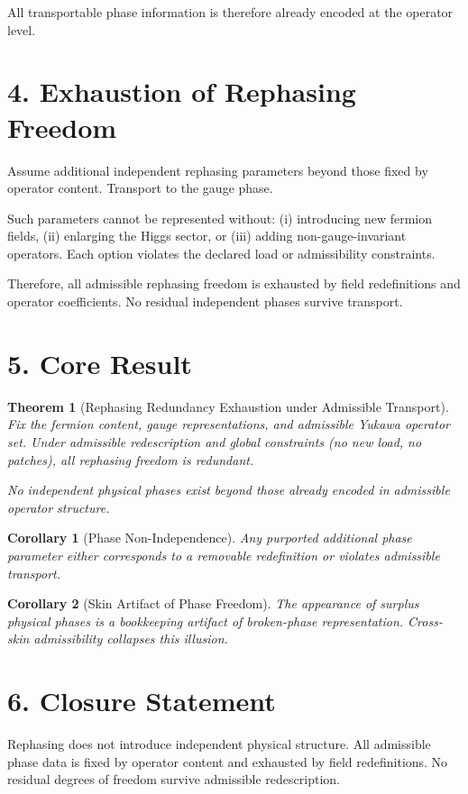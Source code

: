 ﻿\documentclass[11pt]{article}
\newtheorem{theorem}{Theorem}
\newtheorem{corollary}{Corollary}
\begin{document}
All transportable phase information is therefore already encoded
at the operator level.

\section*{4. Exhaustion of Rephasing Freedom}
Assume additional independent rephasing parameters
beyond those fixed by operator content.
Transport to the gauge phase.

Such parameters cannot be represented without:
(i) introducing new fermion fields,
(ii) enlarging the Higgs sector, or
(iii) adding non-gauge-invariant operators.
Each option violates the declared load or admissibility constraints.

Therefore, all admissible rephasing freedom
is exhausted by field redefinitions and operator coefficients.
No residual independent phases survive transport.

\section*{5. Core Result}
\begin{theorem}[Rephasing Redundancy Exhaustion under Admissible Transport]
Fix the fermion content, gauge representations,
and admissible Yukawa operator set.
Under admissible redescription and global constraints
(no new load, no patches),
all rephasing freedom is redundant.

No independent physical phases exist
beyond those already encoded in admissible operator structure.
\end{theorem}

\begin{corollary}[Phase Non-Independence]
Any purported additional phase parameter
either corresponds to a removable redefinition
or violates admissible transport.
\end{corollary}

\begin{corollary}[Skin Artifact of Phase Freedom]
The appearance of surplus physical phases
is a bookkeeping artifact of broken-phase representation.
Cross-skin admissibility collapses this illusion.
\end{corollary}

\section*{6. Closure Statement}
Rephasing does not introduce independent physical structure.
All admissible phase data is fixed by operator content
and exhausted by field redefinitions.
No residual degrees of freedom survive admissible redescription.
\end{document}
